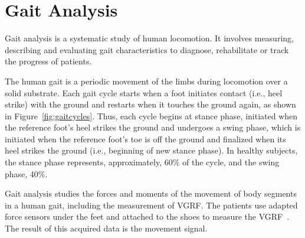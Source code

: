 \documentclass[10pt, conference, compsocconf]{IEEEtran}
\begin{document}


\section{Gait Analysis}\label{sec:gait_analysis}
Gait analysis is a systematic study of human locomotion. It involves measuring, describing and evaluating gait characteristics to diagnose, rehabilitate or track the progress of patients.

The human gait is a periodic movement of the limbs during locomotion over a solid substrate. Each gait cycle starts when a foot initiates contact (i.e., heel strike) with the ground and restarts when it touches the ground again, as shown in Figure~\ref{fig:gaitcycles}. Thus, each cycle begins at stance phase, initiated when the reference foot's heel strikes the ground and undergoes a swing phase, which is initiated when the reference foot's toe is off the ground and finalized when its heel strikes the ground (i.e., beginning of new stance phase). In healthy subjects, the stance phase represents, approximately, $60\%$ of the cycle, and the swing phase, $40\%$. 

Gait analysis studies the forces and moments of the movement of body segments in a human gait, including the measurement of VGRF. The patients use adapted force sensors under the feet and attached to the shoes to measure the VGRF~\cite{gaitusingsensorsreview2012}. The result of this acquired data is the movement signal.


\end{document}
